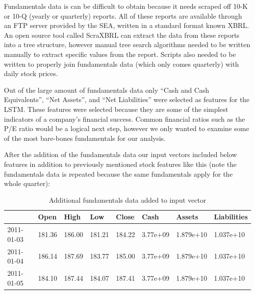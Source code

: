 \documentclass{article}
\begin{document}
Fundamentals data is can be difficult to obtain because it needs scraped off 10-K or 10-Q (yearly or quarterly) reports. All of these reports are available through an FTP server provided by the SEA, written in a standard format known XBRL. An open source tool called ScraXBRL can extract the data from these reports into a tree structure, however manual tree search algorithms needed to be written manually to extract specific values from the report. Scripts also needed to be written to properly join fundamentals data (which only comes quarterly) with daily stock prices. 

Out of the large amount of fundamentals data only “Cash and Cash Equivalents”, “Net Assets”, and “Net Liabilities” were selected as features for the LSTM. These features were selected because they are some of the simplest indicators of a company's financial success. Common financial ratios such as the P/E ratio would be a logical next step, however we only wanted to examine some of the most bare-bones fundamentals for our analysis. 

After the addition of the fundamentals data our input vectors included below features in addition to previously mentioned stock features like this (note the fundamentals data is repeated because the same fundamentals apply for the whole quarter):
\begin{table}[H]
\centering
\begin{adjustbox}{width=0.5\textwidth}
\small
\begin{tabular}{|l|l|l|l|l|l|l|l|}
\hline
 & Open & High & Low & Close  & Cash & Assets & Liabilities \\ \hline
2011-01-03 & 181.36 & 186.00 & 181.21 & 184.22 & 3.77e+09 & 1.879e+10 & 1.037e+10 \\ \hline
2011-01-04 & 186.14 & 187.69 & 183.77 & 185.00 & 3.77e+09 & 1.879e+10 & 1.037e+10 \\ \hline
2011-01-05 & 184.10 & 187.44 & 184.07 & 187.41 & 3.77e+09 & 1.879e+10 & 1.037e+10 \\ \hline
\end{tabular}
\end{adjustbox}
\caption{Additional fundamentals data added to input vector}
\end{table}
\end{document}
